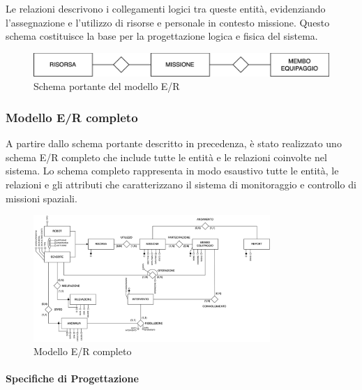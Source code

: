 Le relazioni descrivono i collegamenti logici tra queste entità, evidenziando l'assegnazione e l'utilizzo di risorse e personale in contesto missione. Questo schema costituisce la base per la progettazione logica e fisica del sistema.

\begin{figure}[h!]
    \centering
    \includegraphics[width=1\textwidth]{Media/schema_portante.png}
    \caption{Schema portante del modello E/R}
    \label{fig:schema_portante}
\end{figure}


\subsubsection{Modello E/R completo}

A partire dallo schema portante descritto in precedenza, è stato realizzato uno schema E/R completo che include tutte le entità e le relazioni coinvolte nel sistema. Lo schema completo rappresenta in modo esaustivo tutte le entità, le relazioni e gli attributi che caratterizzano il sistema di monitoraggio e controllo di missioni spaziali.

\begin{figure}[h!]
    \centering
    \includegraphics[width=0.8\textwidth]{Media/ER_Completo.png}
    \caption{Modello E/R completo}
    \label{fig:schema_portante}
\end{figure}

\paragraph{Specifiche di Progettazione}

